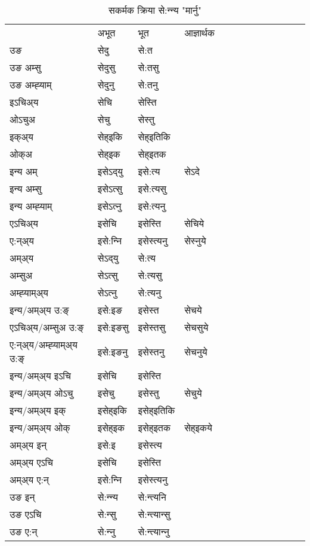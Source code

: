 \begin{table}[H]
\centering
\caption{\label{et.vt} सकर्मक क्रिया  से:न्‍न्य  "मार्नु"  }
\begin{tabular}{l|l|l|l|l|l|l|l|l|l|l|l|l}  \toprule
&अभूत & भूत & आज्ञार्थक \\ 
उङ &सेदु &से:त \\ 
उङ अम्सु &सेदुसु &से:तसु \\ 
उङ अम्ह्‍याम् &सेदुनु &से:तनु \\ 
इऽचिअ्य &सेचि &सेस्ति   \\ 
ओऽचुअ &सेचु &सेस्तु   \\ 
इक्अ्य &सेह्इकि &सेह्इतिकि   \\ 
ओक्अ &सेह्इक &सेह्इतक   \\ 
इन्य अम् & इसेऽद्‌यु  & इसे:त्य &सेऽदे  \\ 
इन्य अम्सु & इसेऽत्सु  & इसे:त्यसु   \\ 
इन्य अम्ह्‍याम् & इसेऽत्‍नु  & इसे:त्यनु   \\ 
एऽचिअ्य & इसेचि & इसेस्ति &सेचिये    \\ 
ए:न्अ्य & इसे:न्‍नि  & इसेस्त्यनु &सेस्‍नुये  \\ 
अम्अ्य & सेऽद्‌यु  & से:त्य  \\ 
अम्सुअ & सेऽत्सु & से:त्यसु  \\ 
अम्ह्‍याम्अ्य & सेऽत्‍नु  & से:त्यनु \\ 
\midrule
इन्य/अम्अ्य उ:ङ्‌&इसे:इङ & इसेस्त &सेचये \\ 
एऽचिअ्य/अम्सुअ उ:ङ्‌ &इसे:इङसु & इसेस्तसु &सेचसुये \\ 
ए:न्अ्य/अम्ह्‍याम्अ्य उ:ङ्‌ &इसे:इङनु & इसेस्तनु &सेचनुये \\ 
इन्य/अम्अ्य इऽचि & इसेचि & इसेस्ति    \\ 
इन्य/अम्अ्य ओऽचु & इसेचु & इसेस्तु  &सेचुये  \\ 
इन्य/अम्अ्य इक् & इसेह्इकि & इसेह्इतिकि   \\ 
इन्य/अम्अ्य ओक् & इसेह्इक & इसेह्इतक  &सेह्इकये  \\ 
अम्अ्य इन् & इसे:इ & इसेस्त्य   \\ 
अम्अ्य एऽचि & इसेचि & इसेस्ति    \\ 
अम्अ्य ए:न् & इसे:न्‍नि  & इसेस्त्यनु  \\ 
\midrule
उङ इन् & से:न्‍न्य  & से:न्त्यनि  \\ 
उङ एऽचि & से:न्सु  & से:न्त्यान्सु   \\ 
उङ ए:न्& से:न्‍नु  & से:न्त्यान्‍नु   \\ 
\bottomrule
\end{tabular}
\end{table}


